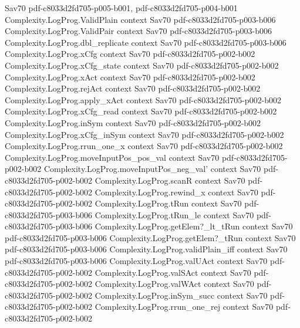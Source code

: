 \begin{theorem}
  {Sav70}
  {pdf-c8033d2fd705-p005-b001,
    pdf-c8033d2fd705-p004-b001}
\proofstep
  {Complexity.LogProg.ValidPlain}
  {context}
  {Sav70}
  {pdf-c8033d2fd705-p003-b006}
\proofstep
  {Complexity.LogProg.ValidPair}
  {context}
  {Sav70}
  {pdf-c8033d2fd705-p003-b006}
\proofstep
  {Complexity.LogProg.dbl_replicate}
  {context}
  {Sav70}
  {pdf-c8033d2fd705-p003-b006}
\proofstep
  {Complexity.LogProg.xCfg}
  {context}
  {Sav70}
  {pdf-c8033d2fd705-p002-b002}
\proofstep
  {Complexity.LogProg.xCfg_state}
  {context}
  {Sav70}
  {pdf-c8033d2fd705-p002-b002}
\proofstep
  {Complexity.LogProg.xAct}
  {context}
  {Sav70}
  {pdf-c8033d2fd705-p002-b002}
\proofstep
  {Complexity.LogProg.rejAct}
  {context}
  {Sav70}
  {pdf-c8033d2fd705-p002-b002}
\proofstep
  {Complexity.LogProg.apply_xAct}
  {context}
  {Sav70}
  {pdf-c8033d2fd705-p002-b002}
\proofstep
  {Complexity.LogProg.xCfg_read}
  {context}
  {Sav70}
  {pdf-c8033d2fd705-p002-b002}
\proofstep
  {Complexity.LogProg.inSym}
  {context}
  {Sav70}
  {pdf-c8033d2fd705-p002-b002}
\proofstep
  {Complexity.LogProg.xCfg_inSym}
  {context}
  {Sav70}
  {pdf-c8033d2fd705-p002-b002}
\proofstep
  {Complexity.LogProg.rrun_one_x}
  {context}
  {Sav70}
  {pdf-c8033d2fd705-p002-b002}
\proofstep
  {Complexity.LogProg.moveInputPos_pos_val}
  {context}
  {Sav70}
  {pdf-c8033d2fd705-p002-b002}
\proofstep
  {Complexity.LogProg.moveInputPos_neg_val'}
  {context}
  {Sav70}
  {pdf-c8033d2fd705-p002-b002}
\proofstep
  {Complexity.LogProg.scanR}
  {context}
  {Sav70}
  {pdf-c8033d2fd705-p002-b002}
\proofstep
  {Complexity.LogProg.rewind_x}
  {context}
  {Sav70}
  {pdf-c8033d2fd705-p002-b002}
\proofstep
  {Complexity.LogProg.tRun}
  {context}
  {Sav70}
  {pdf-c8033d2fd705-p003-b006}
\proofstep
  {Complexity.LogProg.tRun_le}
  {context}
  {Sav70}
  {pdf-c8033d2fd705-p003-b006}
\proofstep
  {Complexity.LogProg.getElem?_lt_tRun}
  {context}
  {Sav70}
  {pdf-c8033d2fd705-p003-b006}
\proofstep
  {Complexity.LogProg.getElem?_tRun}
  {context}
  {Sav70}
  {pdf-c8033d2fd705-p003-b006}
\proofstep
  {Complexity.LogProg.validPlain_iff}
  {context}
  {Sav70}
  {pdf-c8033d2fd705-p003-b006}
\proofstep
  {Complexity.LogProg.valUAct}
  {context}
  {Sav70}
  {pdf-c8033d2fd705-p002-b002}
\proofstep
  {Complexity.LogProg.valSAct}
  {context}
  {Sav70}
  {pdf-c8033d2fd705-p002-b002}
\proofstep
  {Complexity.LogProg.valWAct}
  {context}
  {Sav70}
  {pdf-c8033d2fd705-p002-b002}
\proofstep
  {Complexity.LogProg.inSym_succ}
  {context}
  {Sav70}
  {pdf-c8033d2fd705-p002-b002}
\proofstep
  {Complexity.LogProg.rrun_one_rej}
  {context}
  {Sav70}
  {pdf-c8033d2fd705-p002-b002}

\end{theorem}
